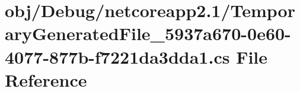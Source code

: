 \hypertarget{_debug_2netcoreapp2_81_2_temporary_generated_file__5937a670-0e60-4077-877b-f7221da3dda1_8cs}{}\section{obj/\+Debug/netcoreapp2.1/\+Temporary\+Generated\+File\+\_\+5937a670-\/0e60-\/4077-\/877b-\/f7221da3dda1.cs File Reference}
\label{_debug_2netcoreapp2_81_2_temporary_generated_file__5937a670-0e60-4077-877b-f7221da3dda1_8cs}
